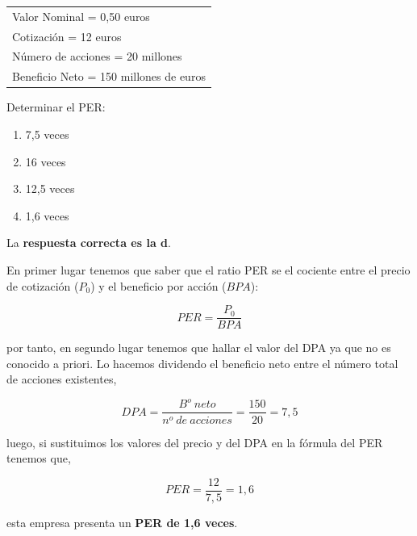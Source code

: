 \documentclass[
  letterpaper,
  DIV=11,
  numbers=noendperiod]{scrreprt}
\begin{document}
\begin{longtable}[]{@{}l@{}}
\toprule()
\endhead
Valor Nominal = 0,50 euros \\
Cotización = 12 euros \\
Número de acciones = 20 millones \\
Beneficio Neto = 150 millones de euros \\
\bottomrule()
\end{longtable}

Determinar el PER:

\begin{enumerate}
\def\labelenumi{\alph{enumi}.}
\item
  7,5 veces
\item
  16 veces
\item
  12,5 veces
\item
  1,6 veces
\end{enumerate}

\begin{tcolorbox}[enhanced jigsaw, left=2mm, opacityback=0, colback=white, breakable, arc=.35mm, bottomrule=.15mm, rightrule=.15mm, toprule=.15mm, leftrule=.75mm, colframe=quarto-callout-tip-color-frame]
\begin{minipage}[t]{5.5mm}
\textcolor{quarto-callout-tip-color}{\faLightbulb}
\end{minipage}%
\begin{minipage}[t]{\textwidth - 5.5mm}

La \textbf{respuesta correcta es la d}.

En primer lugar tenemos que saber que el ratio PER se el cociente entre
el precio de cotización (\(P_0\)) y el beneficio por acción (\(BPA\)):

\[PER=\frac{P_0}{BPA}\]

por tanto, en segundo lugar tenemos que hallar el valor del DPA ya que
no es conocido a priori. Lo hacemos dividendo el beneficio neto entre el
número total de acciones existentes,

\[DPA=\frac{B^o\ neto}{n^o\ de\ acciones}=\frac{150}{20}=7,5\]

luego, si sustituimos los valores del precio y del DPA en la fórmula del
PER tenemos que,

\[PER=\frac{12}{7,5}=1,6\]

esta empresa presenta un \textbf{PER de 1,6 veces}.

\end{minipage}%
\end{tcolorbox}
\end{document}
